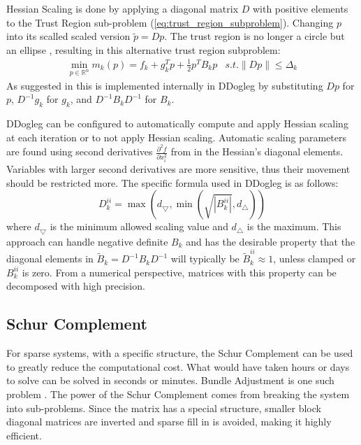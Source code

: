 \documentclass[peerreview,compsoc,onecolumn]{IEEEtran}
\newcommand{\R}{\mathbb{R}}
\newcommand{\norm}[1]{\left\lVert#1\right\rVert}
\begin{document}
Hessian Scaling is done by applying a diagonal matrix $D$ with positive elements to the Trust Region sub-problem (\ref{eq:trust_region_subproblem}). Changing $p$ into its scalled scaled version $\tilde{p} = Dp$. The trust region is no longer a circle but an ellipse \cite{numopt2006}, resulting in this alternative trust region subproblem:
\begin{equation}
\begin{array}{lr}
\min\limits_{p\in \R^n} m_k(p) = f_k + g^T_k p + \frac{1}{2}p^T B_k p & s.t. \norm{Dp} \le \Delta_k
\end{array}
\end{equation}
As suggested in \cite{numopt2006} this is implemented internally in DDogleg by substituting $Dp$ for $p$, $D^{-1}g_k$ for $g_k$, and $D^{-1}B_k D^{-1}$ for $B_k$.  

DDogleg can be configured to automatically compute and apply Hessian scaling at each iteration or to not apply Hessian scaling. Automatic scaling parameters are found using second derivatives $\frac{\partial^2 f}{\partial x^2_i}$ from in the Hessian's diagonal elements. Variables with larger second derivatives are more sensitive, thus their movement should be restricted more. The specific formula used in DDogleg is as follows:
\begin{equation}
D_k^{ii} = \max\left( d_{\bigtriangledown},\min\left( \sqrt{|B_k^{ii}|} , d_{\bigtriangleup} \right)\right)
\end{equation}
where $d_{\bigtriangledown}$ is the minimum allowed scaling value and $d_{\bigtriangleup}$ is the maximum. This approach can handle negative definite $B_k$ and has the desirable property \cite{dennis1996} that the diagonal elements in $\tilde{B}_k = D^{-1}B_k D^{-1}$ will typically be $\tilde{B}_k^{ii} \approx 1$, unless clamped or $B_k^{ii}$ is zero. From a numerical perspective, matrices with this property can be decomposed with high precision. 

\subsection{Schur Complement}
For sparse systems, with a specific structure, the Schur Complement can be used to greatly reduce the computational cost. What would have taken hours or days to solve can be solved in seconds or minutes. Bundle Adjustment is one such problem \cite{triggs1999bundle}. The power of the Schur Complement comes from breaking the system into sub-problems. Since the matrix has a special structure, smaller block diagonal matrices are inverted and sparse fill in \cite{davis2006} is avoided, making it highly efficient.
\end{document}
